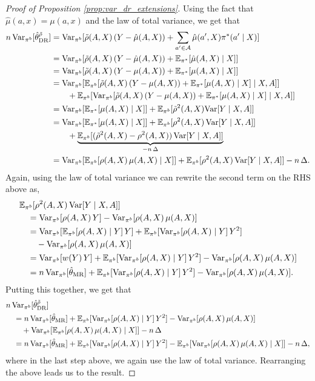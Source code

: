 \begin{proof}[Proof of Proposition \ref{prop:var_dr_extensions}]
Using the fact that $\hat{\mu}(a, x) = \mu(a, x) $ and the law of total variance, we get that
\begin{align*}
    n\,\textup{Var}_{\pi^b}[\hat{\theta}_{\textup{DR}}^{\tilde{\rho}}] &= \textup{Var}_{\pi^b}[\tilde{\rho}(A, X)\,(Y -\hat{\mu}(A, X)) + \sum_{a'\in \mathcal{A}}\hat{\mu}(a', X)\pi^*(a'\mid X) ]\\
    &= \textup{Var}_{\pi^b}[\tilde{\rho}(A, X)\,(Y -\hat{\mu}(A, X)) + \mathbb{E}_{\pi^*}[\hat{\mu}(A, X)\mid X] ]\\
    &= \textup{Var}_{\pi^b}[\tilde{\rho}(A, X)\,(Y -\mu(A, X)) + \mathbb{E}_{\pi^*}[\mu(A, X)\mid X] ]\\
    &= \textup{Var}_{\pi^b}[\mathbb{E}_{\pi^b}[\tilde{\rho}(A, X)\,(Y -\mu(A, X)) + \mathbb{E}_{\pi^*}[\mu(A, X)\mid X] \mid X, A]] \\
    &\qquad+ \mathbb{E}_{\pi^b}[\textup{Var}_{\pi^b}[\tilde{\rho}(A, X)\,(Y -\mu(A, X)) + \mathbb{E}_{\pi^*}[\mu(A, X)\mid X]\mid X, A]]\\
    &= \textup{Var}_{\pi^b}[\mathbb{E}_{\pi^*}[\mu(A, X)\mid X]] + \mathbb{E}_{\pi^b}[\tilde{\rho}^2(A, X)\textup{Var}[Y\mid X, A]]\\
    &= \textup{Var}_{\pi^b}[\mathbb{E}_{\pi^*}[\mu(A, X)\mid X]] + \mathbb{E}_{\pi^b}[\rho^2(A, X)\,\textup{Var}[Y\mid X, A]] \\
    &\qquad+ \underbrace{\mathbb{E}_{\pi^b}[(\tilde{\rho}^2(A, X) - \rho^2(A, X))\,\textup{Var}[Y\mid X, A]]}_{-n\,\Delta}\\
    &= \textup{Var}_{\pi^b}[\mathbb{E}_{\pi^b}[\rho(A, X)\,\mu(A, X)\mid X]] + \mathbb{E}_{\pi^b}[\rho^2(A, X)\,\textup{Var}[Y\mid X, A]] - n\,\Delta.
\end{align*}
    Again, using the law of total variance we can rewrite the second term on the RHS above as,
    \begin{align*}
        &\mathbb{E}_{\pi^b}[\rho^2(A, X)\,\textup{Var}[Y\mid X, A]] \\
        &\quad= \textup{Var}_{\pi^b}[\rho(A, X)\, Y] - \textup{Var}_{\pi^b}[\rho(A, X)\,\mu(A, X)]\\
        &\quad= \textup{Var}_{\pi^b}[\mathbb{E}_{\pi^b}[\rho(A, X)\mid Y]\, Y] + \mathbb{E}_{\pi^b}[\textup{Var}_{\pi^b}[\rho(A, X)\mid Y]\,Y^2] \\
        &\qquad- \textup{Var}_{\pi^b}[\rho(A, X)\,\mu(A, X)]\\
        &\quad= \textup{Var}_{\pi^b}[w(Y)\, Y] + \mathbb{E}_{\pi^b}[\textup{Var}_{\pi^b}[\rho(A, X)\mid Y]\,Y^2] - \textup{Var}_{\pi^b}[\rho(A, X)\,\mu(A, X)]\\
        &\quad= n\,\textup{Var}_{\pi^b}[\hat{\theta}_{\textup{MR}}] + \mathbb{E}_{\pi^b}[\textup{Var}_{\pi^b}[\rho(A, X)\mid Y]\,Y^2] - \textup{Var}_{\pi^b}[\rho(A, X)\,\mu(A, X)].
    \end{align*}
    Putting this together, we get that
    \begin{align*}
        &n\,\textup{Var}_{\pi^b}[\hat{\theta}_{\textup{DR}}^{\tilde{\rho}}] \\
        &\quad= n\,\textup{Var}_{\pi^b}[\hat{\theta}_{\textup{MR}}] + \mathbb{E}_{\pi^b}[\textup{Var}_{\pi^b}[\rho(A, X)\mid Y]\,Y^2] - \textup{Var}_{\pi^b}[\rho(A, X)\,\mu(A, X)] \\
        &\qquad+ \textup{Var}_{\pi^b}[\mathbb{E}_{\pi^b}[\rho(A, X)\,\mu(A, X)\mid X]] - n\,\Delta\\
        &\quad= n\,\textup{Var}_{\pi^b}[\hat{\theta}_{\textup{MR}}] + \mathbb{E}_{\pi^b}[\textup{Var}_{\pi^b}[\rho(A, X)\mid Y]\,Y^2] - \mathbb{E}_{\pi^b}[\textup{Var}_{\pi^b}[\rho(A, X)\,\mu(A, X)\mid X]] - n\,\Delta,
    \end{align*}
    where in the last step above, we again use the law of total variance. Rearranging the above leads us to the result. 
\end{proof}
